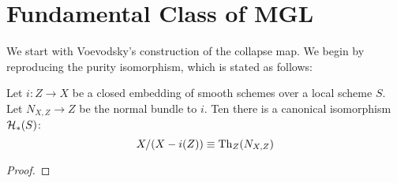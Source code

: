 \section{Fundamental Class of MGL}

We start with Voevodsky's construction of the collapse
map. We begin by reproducing the purity isomorphism, which
is stated as follows:

\begin{thm}
Let $i: Z \to X$ be a closed embedding of smooth schemes over a 
local scheme $S$. Let $N_{X,Z} \to Z$ be the normal bundle to 
$i$. Ten there is a canonical isomorphism $\mathcal{H}_*(S)$:
\[
X/(X - i(Z)) \equiv \mathrm{Th}_Z(N_{X,Z})
\]
\end{thm}

\begin{proof}
\end{proof}
